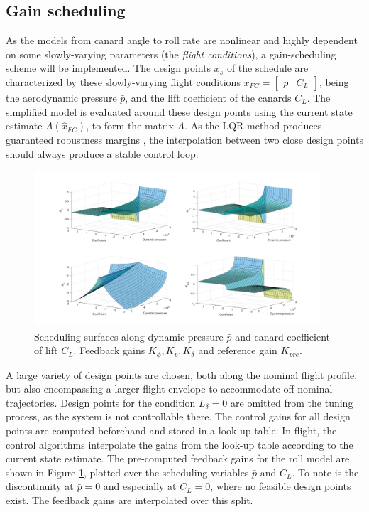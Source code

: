 \subsection{Gain scheduling}
\label{sec:controller-scheduling}
As the models from canard angle to roll rate are nonlinear and highly dependent on some slowly-varying parameters (the \textit{flight conditions}), a gain-scheduling scheme will be implemented. 
The design points $x_s$ of the schedule are characterized by these slowly-varying flight conditions $x_{FC} = \begin{bmatrix} \bar p & C_L \end{bmatrix}$, being the aerodynamic pressure $\bar p$, and the lift coefficient of the canards $C_L$. 
The simplified model is evaluated around these design points using the current state estimate $A(\hat x_{FC})$, to form the matrix $A$.
As the LQR method produces guaranteed robustness margins \cite{doyle1978, werner2021, werner2021b}, the  interpolation between two close design points should always produce a stable control loop.
\begin{figure}[ht]
    \centering
    \includegraphics[width=0.95\textwidth]{images-design/controller_scheduling-surfaces.png}
    \caption[Scheduling surfaces along dynamic pressure and canard coefficient]{Scheduling surfaces along dynamic pressure $\bar p$ and canard coefficient of lift $C_L$. Feedback gains $K_\phi, K_p, K_\delta$ and reference gain $K_\textit{pre}$.}
    \label{fig:controller-surfaces}
\end{figure}

A large variety of design points are chosen, both along the nominal flight profile, but also encompassing a larger flight envelope to accommodate off-nominal trajectories.
Design points for the condition $L_\delta = 0$ are omitted from the tuning process, as the system is not controllable there.
The control gains for all design points are computed beforehand and stored in a look-up table.
In flight, the control algorithms interpolate the gains from the look-up table according to the current state estimate. 
The pre-computed feedback gains for the roll model are shown in Figure \ref{fig:controller-surfaces}, plotted over the scheduling variables $\bar p$ and $C_L$.
To note is the discontinuity at $\bar p = 0$ and especially at $C_L = 0$, where no feasible design points exist. 
The feedback gains are interpolated over this split.


